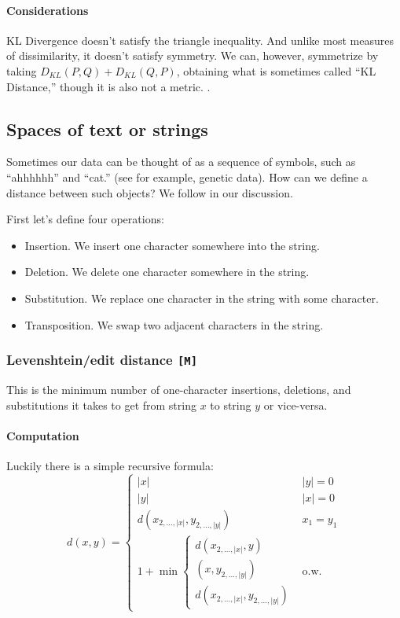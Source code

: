 \documentclass[12pt,a4paper]{article}
\newcommand{\1}[1]{\mathds{1}\left[#1\right]}
\begin{document}
\paragraph{Considerations} KL Divergence doesn't satisfy the triangle inequality. And unlike most measures of dissimilarity, it doesn't satisfy symmetry. We can, however, symmetrize by taking $D_{KL}(P,Q)+D_{KL}(Q,P)$, obtaining what is sometimes called ``KL Distance,'' though it is also not a metric. \cite{kldist,tsybakov}.


\subsection{Spaces of text or strings}
Sometimes our data can be thought of as a sequence of symbols, such as ``ahhhhhh'' and ``cat.'' (see for example, genetic data). How can we define a distance between such objects? We follow \cite{stringmatching} in our discussion.

First let's define four operations:
\begin{itemize}
    \item Insertion. We insert one character somewhere into the string.
    \item Deletion. We delete one character somewhere in the string.
    \item Substitution. We replace one character in the string with some character.
    \item Transposition. We swap two adjacent characters in the string.
\end{itemize}

\subsubsection{Levenshtein/edit distance \texttt{[M]}}
This is the minimum number of one-character insertions, deletions, and substitutions it takes to get from string $x$ to string $y$ or vice-versa.
\paragraph{Computation} Luckily there is a simple recursive formula:
\[d(x,y)=\begin{cases}|x| & |y|=0\\ |y| & |x|=0\\ d(x_{2,\ldots,|x|},y_{2,\ldots,|y|}) & x_1=y_1\\ 1+\min\begin{cases}d(x_{2,\ldots,|x|},y)\\(x,y_{2,\ldots,|y|})\\d(x_{2,\ldots,|x|},y_{2,\ldots,|y|})\end{cases} &\text{o.w.} \end{cases}\]
\end{document}
